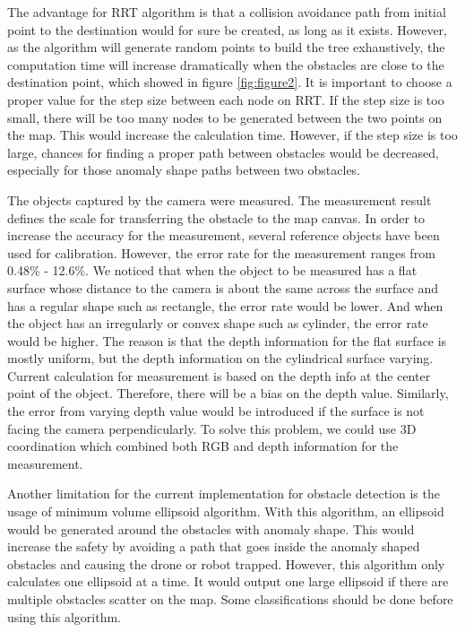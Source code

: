 \documentclass[
  oneside]{ubcthesis}
\begin{document}
The advantage for RRT algorithm is that a collision avoidance path from initial point to the destination would for sure be created, as long as it exists. However, as the algorithm will generate random points to build the tree exhaustively, the computation time will increase dramatically when the obstacles are close to the destination point, which showed in figure \ref{fig:figure2}. It is important to choose a proper value for the step size between each node on RRT. If the step size is too small, there will be too many nodes to be generated between the two points on the map. This would increase the calculation time. However, if the step size is too large, chances for finding a proper path between obstacles would be decreased, especially for those anomaly shape paths between two obstacles.

The objects captured by the camera were measured. The measurement result defines the scale for transferring the obstacle to the map canvas. In order to increase the accuracy for the measurement, several reference objects have been used for calibration. However, the error rate for the measurement ranges from 0.48\% - 12.6\%. We noticed that when the object to be measured has a flat surface whose distance to the camera is about the same across the surface and has a regular shape such as rectangle, the error rate would be lower. And when the object has an irregularly or convex shape such as cylinder, the error rate would be higher. The reason is that the depth information for the flat surface is mostly uniform, but the depth information on the cylindrical surface varying. Current calculation for measurement is based on the depth info at the center point of the object. Therefore, there will be a bias on the depth value. Similarly, the error from varying depth value would be introduced if the surface is not facing the camera perpendicularly. To solve this problem, we could use 3D coordination which combined both RGB and depth information for the measurement.

Another limitation for the current implementation for obstacle detection is the usage of minimum volume ellipsoid algorithm. With this algorithm, an ellipsoid would be generated around the obstacles with anomaly shape. This would increase the safety by avoiding a path that goes inside the anomaly shaped obstacles and causing the drone or robot trapped. However, this algorithm only calculates one ellipsoid at a time. It would output one large ellipsoid if there are multiple obstacles scatter on the map. Some classifications should be done before using this algorithm.
\end{document}
